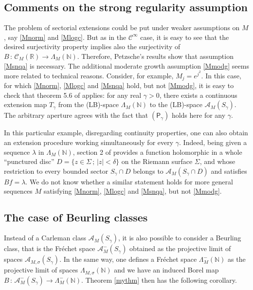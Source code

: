 \documentclass[a4paper]{amsart}
\theoremstyle{plain}
\theoremstyle{definition}
\theoremstyle{remark}
\begin{document}
\subsection{Comments on the strong regularity assumption}\label{gene}

The problem of sectorial extensions could be put 
under weaker assumptions on $ M $, say \eqref{Mnorm} and
\eqref{Mlogc}. But as
in the $ \mathcal{C}^\infty $ case, it is easy to see
that the desired surjectivity property implies also the
surjectivity of $ B\, :\, \mathcal{C}_M(\mathbb{R})\longrightarrow \Lambda_M(\mathbb{N}) $. Therefore, Petzsche's results \cite{Pet} show that assumption \eqref{Msnqa} is necessary. 
The additional moderate growth assumption \eqref{Mmodg} seems more related to technical reasons. Consider, for example, $ M_j=e^{j^2} $. In this case, for which \eqref{Mnorm},
\eqref{Mlogc} and \eqref{Msnqa} hold, but not \eqref{Mmodg}, it is easy to
check that theorem 5.6 of \cite{SV} applies: for any real $ \gamma>0 $, there
exists a continuous extension map $ T_\gamma $ from the (LB)-space 
$ \Lambda_M(\mathbb{N}) $ to the
(LB)-space $ \mathcal{A}_M(S_\gamma) $. The arbitrary aperture agrees
with the fact that $ (\mathsf{P}_\gamma) $ holds here for any
$ \gamma $.

In this particular example, disregarding continuity properties, one can also obtain an extension procedure working simultaneously for every $ \gamma $. Indeed, being
given a sequence $ \lambda$ in $ \Lambda_M(\mathbb{N}) $, section 2 of \cite{Zhang}
provides a function holomorphic
in a whole ``punctured disc'' $ D=\{z\in\Sigma\, ;\, \vert z\vert<\delta \} $ on the
Riemann surface $ \Sigma $, and whose restriction to every bounded sector
$ S_\gamma\cap D $ belongs to $ \mathcal{A}_M(S_\gamma\cap D) $ and
satisfies $ Bf=\lambda $. We do not know
whether a similar statement holds for more general sequences $ M $ satisfying \eqref{Mnorm}, \eqref{Mlogc} and \eqref{Msnqa}, but not \eqref{Mmodg}.

\subsection{The case of Beurling classes}\label{Beurling}

Instead of a Carleman class $ \mathcal{A}_M(S_\gamma) $, it is also possible to consider a  Beurling class, that is
the Fr\'echet space $ \mathcal{A}^-_M(S_\gamma) $ obtained as the
projective limit of spaces $ \mathcal{A}_{M,\sigma}(S_\gamma) $. In the same
way, one defines a Fr\'echet
space $ \Lambda^-_M(\mathbb{N}) $ as the projective limit of spaces $ \Lambda_{M,\sigma}(\mathbb{N}) $ and we have an induced Borel map
$ B\, :\, \mathcal{A}^-_M(S_\gamma)\longrightarrow\Lambda^-_M(\mathbb{N}) $. 
Theorem \ref{mythm} then has the following corollary.
\end{document}
